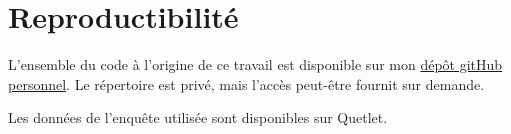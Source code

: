 \documentclass[
  12pt,
]{book}
\begin{document}
\section{Reproductibilité}\label{reproductibilituxe9}

L'ensemble du code à l'origine de ce travail est disponible sur mon
\href{https://github.com/anoukmartin}{dépôt gitHub personnel}. Le
répertoire est privé, mais l'accès peut-être fournit sur demande.

Les données de l'enquête utilisée sont disponibles sur Quetlet.

\backmatter
\end{document}
